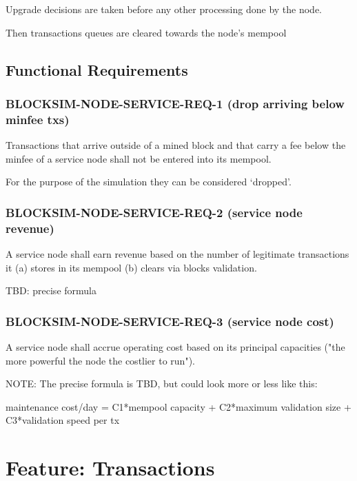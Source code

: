 \documentclass{scrreprt}
\begin{document}
      Upgrade decisions are taken before any other processing done by the node.

      Then transactions queues are cleared towards the node's mempool

    \subsection{Functional Requirements}

      \subsubsection{BLOCKSIM-NODE-SERVICE-REQ-1 (drop arriving below minfee txs)}

        Transactions that arrive outside of a mined block and that carry a fee
        below the minfee of a service node shall not be entered into its mempool.

        For the purpose of the simulation they can be considered `dropped'.

      \subsubsection{BLOCKSIM-NODE-SERVICE-REQ-2 (service node revenue)}

        A service node shall earn revenue based on the number of legitimate
        transactions it (a) stores in its mempool  (b) clears via blocks
        validation.

        TBD: precise formula

      \subsubsection{BLOCKSIM-NODE-SERVICE-REQ-3 (service node cost)}

        A service node shall accrue operating cost based on its principal
        capacities ("the more powerful the node the costlier to run").

        NOTE: The precise formula is TBD, but could look more or less like
        this:

        maintenance cost/day = C1*mempool capacity + C2*maximum validation size
        + C3*validation speed per tx

  \section{Feature: Transactions}
\end{document}
